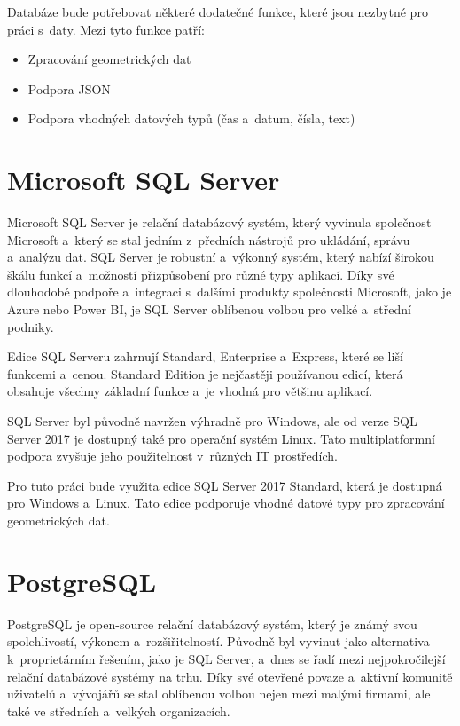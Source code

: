 Databáze bude potřebovat některé dodatečné funkce, které jsou nezbytné pro práci s~daty.
Mezi tyto funkce patří:
\begin{itemize}
    \item Zpracování geometrických dat
    \item Podpora JSON
    \item Podpora vhodných datových typů (čas a~datum, čísla, text)
\end{itemize}

\section{Microsoft SQL Server}
Microsoft SQL Server je relační databázový systém, který vyvinula společnost 
Microsoft a~který se stal jedním z~předních nástrojů pro ukládání, správu a~analýzu dat. 
SQL Server je robustní a~výkonný systém, který nabízí širokou škálu funkcí 
a~možností přizpůsobení pro různé typy aplikací. Díky své dlouhodobé podpoře a~integraci 
s~dalšími produkty společnosti Microsoft, jako je Azure nebo Power BI, je SQL Server 
oblíbenou volbou pro velké a~střední podniky.

Edice SQL Serveru zahrnují Standard, Enterprise a~Express, 
které se liší funkcemi a~cenou. Standard Edition je nejčastěji používanou edicí, 
která obsahuje všechny základní funkce a~je vhodná pro většinu aplikací.

SQL Server byl původně navržen výhradně pro Windows, ale od verze SQL Server 2017 je dostupný 
také pro operační systém Linux. Tato multiplatformní podpora zvyšuje jeho použitelnost 
v~různých IT prostředích.
\cite{microsoft_sql_server}

Pro tuto práci bude využita edice SQL Server 2017 Standard, která je dostupná pro Windows a~Linux.
Tato edice podporuje vhodné datové typy pro zpracování geometrických dat.

\section{PostgreSQL}
PostgreSQL je open-source relační databázový systém, který je známý svou spolehlivostí, výkonem 
a~rozšiřitelností. Původně byl vyvinut jako alternativa k~proprietárním řešením, jako je SQL Server, 
a~dnes se řadí mezi nejpokročilejší relační databázové systémy na trhu. Díky své otevřené povaze 
a~aktivní komunitě uživatelů a~vývojářů se stal oblíbenou volbou nejen mezi malými firmami, 
ale také ve středních a~velkých organizacích.

